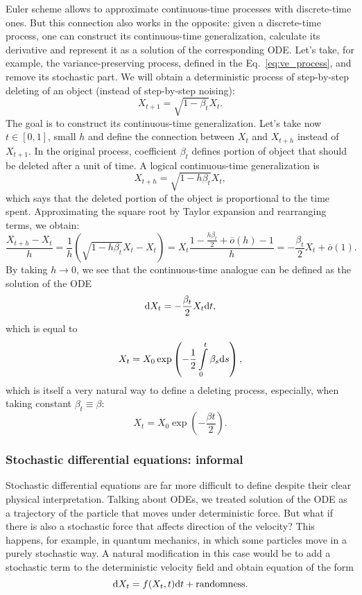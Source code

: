 Euler scheme allows to approximate  continuous-time processes with discrete-time ones. But this connection also works in the opposite: given a discrete-time process, one can construct its continuous-time generalization, calculate its derivative and represent it as a solution of the corresponding ODE. Let's take, for example, the variance-preserving process, defined in the Eq.~\ref{eq:ve_process}, and remove its stochastic part. We will obtain a deterministic process of step-by-step deleting of an object (instead of step-by-step noising):
\[
    X_{t + 1} = \sqrt{1 - \beta_t}X_t.
\]
The goal is to construct its continuous-time generalization. Let's take now $t \in [0, 1]$, small $h$ and define the connection between $X_t$ and $X_{t + h}$ instead of $X_{t + 1}$. In the original process, coefficient $\beta_t$ defines portion of object that should be deleted after a unit of time. A logical continuous-time generalization is
\[
    X_{t + h} = \sqrt{1 - h \beta_t}X_t,
\]
which says that the deleted portion of the object is proportional to the time spent. Approximating the square root by Taylor expansion and rearranging terms, we obtain:
\[
    \frac{X_{t + h} - X_t}{h} = \frac{1}{h}\left(\sqrt{1 - h\beta_t}X_t - X_t\right) = X_t \frac{1 - \frac{h\beta_t}{2} + \overline{o}(h) - 1}{h} = -\frac{\beta_t}{2} X_t + \overline{o}(1).
\]
By taking $h \rightarrow 0$, we see that the continuous-time analogue can be defined as the solution of the ODE
\begin{equation}\label{eq:ode_delete}
    \mathrm{d} X_t = -\frac{\beta_t}{2} X_t \mathrm{d} t,
\end{equation}
which is equal to
\[
    X_t = X_0 \exp\left(-\frac{1}{2}\int\limits_{0}^{t} \beta_s \mathrm{d} s\right),
\]
which is itself a very natural way to define a deleting process, especially, when taking constant $\beta_t \equiv \beta$:
\[
    X_t = X_0 \exp\left(-\frac{\beta t}{2}\right).
\]

\subsubsection{Stochastic differential equations: informal}

Stochastic differential equations are far more difficult to define despite their clear physical interpretation. Talking about ODEs, we treated solution of the ODE as a trajectory of the particle that moves under deterministic force. But what if there is also a stochastic force that affects direction of the velocity? This happens, for example, in quantum mechanics, in which some particles move in a purely stochastic way. A natural modification in this case would be to add a stochastic term to the deterministic velocity field and obtain equation of the form
\[
    \mathrm{d} X_t = f(X_t, t) \mathrm{d} t + \text{randomness}.
\]

